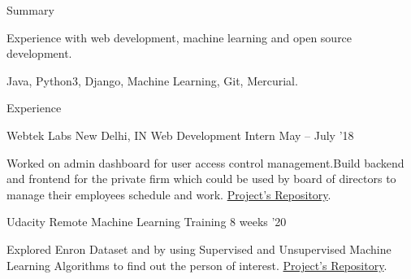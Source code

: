 \documentclass{resume} %
\begin{document}

\begin{rSection}{Summary}
  \begin{rSummarySection}
  {
    \item Experience with web development, machine learning and open source development.
    \item Java, Python3, Django, Machine Learning, Git, Mercurial.
  }
  \end{rSummarySection}
\end{rSection}


\begin{rSection}{Experience}
  \begin{rWorkSection}{Webtek Labs}
                           {New Delhi, IN}
                           {Web Development Intern}
                           {May -- July '18}
  {
    \item Worked on admin dashboard for user access control management.Build backend and frontend for the private firm which could be used by board of directors to manage their employees schedule and work. \href{https://github.com/siddhi523/WebTek}{Project's Repository}.
  }
  \end{rWorkSection}

  \begin{rWorkSection}{Udacity}
                     {Remote}
                     {Machine Learning Training}
                     {8 weeks '20}
  {
    \item    Explored Enron Dataset and by using Supervised and Unsupervised Machine Learning 
  Algorithms to find out the person of interest. \href{https://github.com/siddhi523/ud120-projects}{Project's Repository}.
    
  }
  \end{rWorkSection}
\end{rSection}

\end{document}
